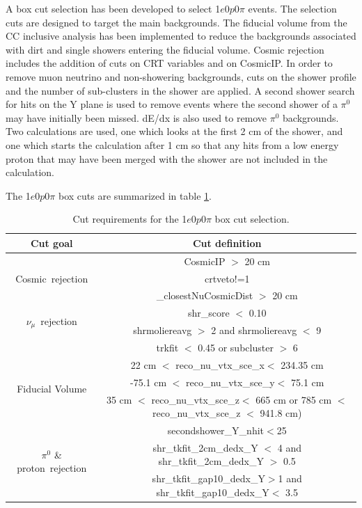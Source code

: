 \documentclass[a4paper]{article}
\newcommand{\zpsel}{1$e$0$p$0$\pi$ }
\begin{document}
A box cut selection has been developed to select \zpsel events. The selection cuts are designed to target the main backgrounds.  The fiducial volume from the CC inclusive analysis \cite{bib:numuCCincl} has been implemented to reduce the backgrounds associated with dirt and single showers entering the fiducial volume.   Cosmic rejection includes the addition of cuts on CRT variables and on CosmicIP.  In order to remove muon neutrino and non-showering backgrounds, cuts on the shower profile and the number of sub-clusters in the shower are applied.  A second shower search for hits on the Y plane is used to remove events where the second shower of a $\pi^{0}$ may have initially been missed.  dE/dx is also used to remove $\pi^{0}$ backgrounds.  Two calculations are used, one which looks at the first 2 cm of the shower, and one which starts the calculation after 1 cm so that any hits from a low energy proton that may have been merged with the shower are not included in the calculation.

The \zpsel box cuts are summarized in table \ref{tab:1e0p:cutbased}.

\begin{table}[h!]
\centering
\setlength{\tabcolsep}{10pt}
\renewcommand{\arraystretch}{1.25}
 \begin{tabular}{| c | c |} 
 \hline
 Cut goal & Cut definition \\
 \hline\hline
\multirow{3}{*}{Cosmic~rejection} & CosmicIP $>$ 20 \si{\cm} \\
& crtveto!=1  \\ & \_closestNuCosmicDist $>$ 20 \si{\cm}\\
 \hline
\multirow{2}{*}{$\nu_\mu$~rejection} & shr\_score $<$ 0.10 \\ & shrmoliereavg $>$ 2 and shrmoliereavg $<$ 9\\ &trkfit $<$ 0.45 or subcluster $>$ 6\\
 \hline
\multirow{3}{*}{Fiducial Volume} & 22 \si{\cm} $<$ reco\_nu\_vtx\_sce\_x$<$ 234.35 \si{\cm} \\
& -75.1 \si{\cm} $<$ reco\_nu\_vtx\_sce\_y$<$ 75.1 \si{\cm} \\ & 35 \si{\cm} $<$ reco\_nu\_vtx\_sce\_z$<$ 665 \si{\cm}  or 785 \si{\cm} $<$ reco\_nu\_vtx\_sce\_z $<$ 941.8 \si{\cm})\\
 \hline
 \multirow{3}{*}{$\pi^0$ \& proton~rejection} & secondshower\_Y\_nhit$<$25 \\ & shr\_tkfit\_2cm\_dedx\_Y $<$ 4 and shr\_tkfit\_2cm\_dedx\_Y $>$ 0.5 \\ & shr\_tkfit\_gap10\_dedx\_Y$>$1 and shr\_tkfit\_gap10\_dedx\_Y$<$ 3.5\\
 \hline
 \end{tabular}
 \caption{\label{tab:1e0p:cutbased} Cut requirements for the \zpsel box cut selection.}
\end{table}
\end{document}

